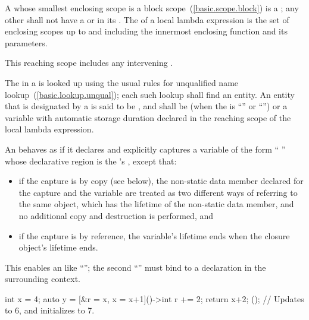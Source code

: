 \pnum
A  whose smallest enclosing scope is a block
scope~(\ref{basic.scope.block}) is a ; any other
 shall not have a  or
 in its
. The  of a local lambda expression
is the set of enclosing scopes up to and including the innermost enclosing function and
its parameters. \begin{note} This reaching scope includes any intervening
. \end{note}

\pnum
The  in a  is looked up using the
usual rules for unqualified name lookup~(\ref{basic.lookup.unqual}); each such lookup
shall find an entity.  An entity that is designated by a
is said to be , and shall be 
(when the 
is ``'' or ``'') or
a variable with automatic storage duration declared in
the reaching scope of the local lambda expression.

\pnum
An  behaves as if it declares and explicitly captures a
variable of
the form ``  \tcode{;}''
whose declarative region is the 's
, except that:
\begin{itemize}
\item if the capture is by copy (see below), the non-static data member
declared for the capture and the variable are treated as two different ways
of referring to the same object, which has the lifetime of the non-static
data member, and no additional copy and destruction is performed, and
\item if the capture is by reference, the variable's lifetime ends when the
closure object's lifetime ends.
\end{itemize}
\begin{note}
This enables an  like
``''; the second ``'' must bind to a
declaration in the surrounding context.
\end{note}
\begin{example}
\begin{codeblock}
int x = 4;
auto y = [&r = x, x = x+1]()->int {
            r += 2;
            return x+2;
         }();  // Updates  to 6, and initializes  to 7.
\end{codeblock}
\end{example}

